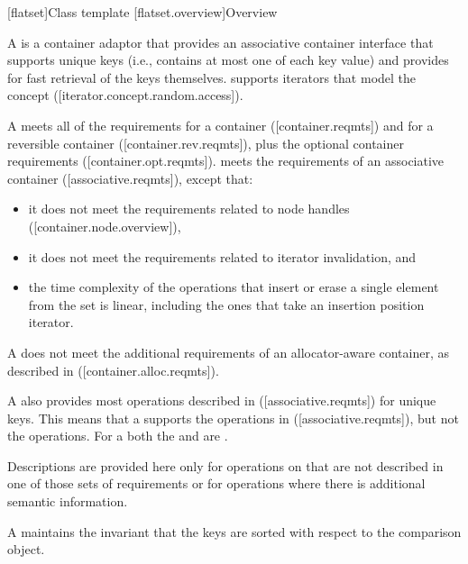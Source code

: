 \noindent\makebox[\linewidth]{\rule{\textwidth}{0.4pt}}

\begin{addedblock}
[flatset]{Class template }
[flatset.overview]{Overview}

\pnum
{}%
A  is a container adaptor that provides an associative
container interface that supports unique keys (i.e., contains at most one of
each key value) and provides for fast retrieval of the keys
themselves.  supports iterators that model
the  concept
([iterator.concept.random.access]).

\pnum
A  meets all of the requirements for a container
([container.reqmts]) and for a reversible container ([container.rev.reqmts]),
plus the optional container requirements ([container.opt.reqmts]).  
meets the requirements of an associative container ([associative.reqmts]), except that:
\begin{itemize}
\item it does not meet the requirements related to node handles ([container.node.overview]),
\item it does not meet the requirements related to iterator invalidation, and
\item the time complexity of the operations that insert or erase a single
element from the set is linear, including the ones that take an insertion
position iterator.
\end{itemize}
\begin{note}A  does not meet the additional requirements of an
allocator-aware container, as described in ([container.alloc.reqmts]).\end{note}

\pnum
A  also provides most operations described
in ([associative.reqmts]) for unique keys.  This means that a
 supports the  operations
in ([associative.reqmts]), but not the  operations.  For a
 both the  and  are
.

\pnum
Descriptions are provided here only for operations on  that
are not described in one of those sets of requirements or for operations where
there is additional semantic information.

\pnum
A  maintains the invariant that the keys are sorted with
respect to the comparison object.


\end{addedblock}
